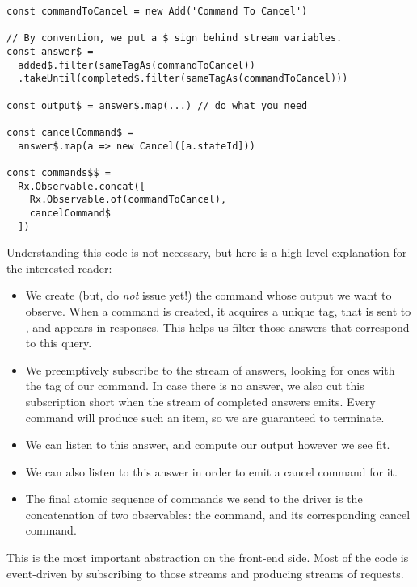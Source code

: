 \begin{verbatim}
const commandToCancel = new Add('Command To Cancel')

// By convention, we put a $ sign behind stream variables.
const answer$ =
  added$.filter(sameTagAs(commandToCancel))
  .takeUntil(completed$.filter(sameTagAs(commandToCancel)))

const output$ = answer$.map(...) // do what you need

const cancelCommand$ =
  answer$.map(a => new Cancel([a.stateId]))

const commands$$ =
  Rx.Observable.concat([
    Rx.Observable.of(commandToCancel),
    cancelCommand$
  ])
\end{verbatim}

Understanding this code is not necessary, but here is a high-level explanation
for the interested reader:

\begin{itemize}

  \item We create (but, do \emph{not} issue yet!) the command whose output we
want to observe.  When a command is created, it acquires a unique tag, that is
sent to \Coq{}, and appears in responses.  This helps us filter those answers
that correspond to this query.

  \item We preemptively subscribe to the stream of answers, looking for ones
with the tag of our command.  In case there is no answer, we also cut this
subscription short when the stream of completed answers emits.  Every command
will produce such an item, so we are guaranteed to terminate.

  \item We can listen to this answer, and compute our output however we see
fit.

  \item We can also listen to this answer in order to emit a cancel command for
it.

  \item The final atomic sequence of commands we send to the driver is the
concatenation of two observables: the command, and its corresponding cancel
command.

\end{itemize}

This is the most important abstraction on the front-end side.  Most of the code
is event-driven by subscribing to those streams and producing streams of
requests.
